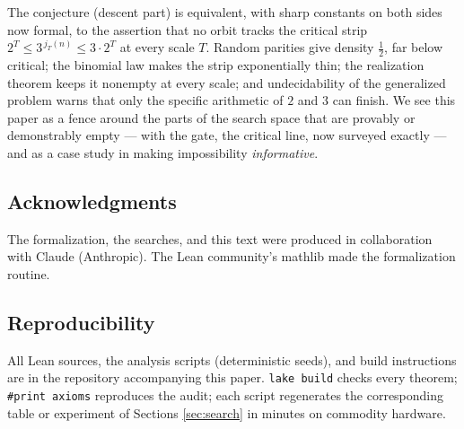\documentclass[11pt]{article}
\newcommand{\code}[1]{\texttt{#1}}
\newcommand{\jodd}[2]{j_{#1}(#2)}
\begin{document}
The conjecture (descent part) is equivalent, with sharp constants on
both sides now formal, to the assertion that no orbit tracks the
critical strip $2^T \le 3^{\,\jodd{T}{n}} \le 3 \cdot 2^T$ at every
scale $T$. Random parities give density $\frac12$, far below critical;
the binomial law makes the strip exponentially thin; the realization
theorem keeps it nonempty at every scale; and undecidability of the
generalized problem warns that only the specific arithmetic of $2$ and
$3$ can finish. We see this paper as a fence around the parts of the
search space that are provably or demonstrably empty --- with the
gate, the critical line, now surveyed exactly --- and as a case study
in making impossibility \emph{informative}.

\subsection*{Acknowledgments}
The formalization, the searches, and this text were produced in
collaboration with Claude (Anthropic). The Lean community's
\textsf{mathlib} made the formalization routine.

\subsection*{Reproducibility}
All Lean sources, the analysis scripts (deterministic seeds), and
build instructions are in the repository accompanying this paper.
\code{lake build} checks every theorem; \code{\#print axioms}
reproduces the audit; each script regenerates the corresponding table
or experiment of Sections \ref{sec:search} in minutes on commodity
hardware.
\end{document}
